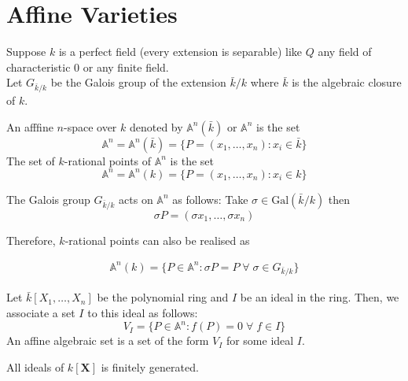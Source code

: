 \documentclass[oneside, 12pt]{scrbook}
\newcommand{\Aa}{\mathbb{A}}
\theoremstyle{theorem}
\begin{document}
\section{Affine Varieties}

Suppose $k$ is a perfect field (every extension is separable) like $Q$ any field of characteristic $0$ or any finite field. \\
Let $G_{\bar{k}/k}$ be the Galois group of the extension $\bar{k}/k$ where $\bar{k}$ is the algebraic closure of $k$.

\begin{definition}
An afffine $n$-space over $k$ denoted by $\Aa^n(\bar{k})$ or $\Aa^n$ is the set 
\begin{equation}
\Aa^n = \Aa^n(\bar{k}) = \{P=(x_{1}, \hdots , x_{n}): x_{i} \in \bar{k}\}
\end{equation}
The set of $k$-rational points of $\Aa^n$ is the set 
\begin{equation}
\Aa^n = \Aa^n(k) = \{P=(x_{1}, \hdots , x_{n}): x_{i} \in k\}
\end{equation}
\end{definition} 

The Galois group $G_{\bar{k}/k}$ acts on $\Aa^n$ as follows: Take $\sigma \in \mathrm{Gal}(\bar{k}/k)$ then 
\begin{equation}
\sigma P = (\sigma x_{1}, \hdots , \sigma x_{n})
\end{equation}

Therefore, $k$-rational points can also be realised as 

\begin{eqnarray}
\Aa^n (k) = \{P \in \Aa^n : \sigma P = P \; \forall \; \sigma \in G_{\bar{k}/k}\}
\end{eqnarray}

\begin{definition}
Let $\bar{k}[X_{1}, \hdots , X_{n}]$ be the polynomial ring and $I$ be an ideal in the ring. Then, we associate a set $I$ to this ideal as follows: 
\begin{equation}
V_{I} = \{P \in \Aa^n : f(P)=0 \; \forall \; f\in I\}
\end{equation}
An affine algebraic set is a set of the form $V_{I}$ for some ideal $I$.
\end{definition}

\begin{theorem}
All ideals of $k[\mathbf{X}]$ is finitely generated.
\end{theorem}
\end{document}
